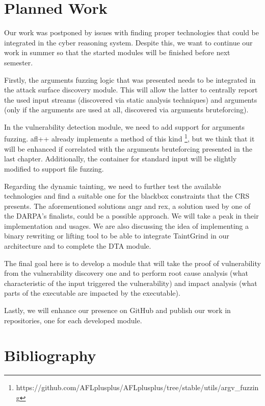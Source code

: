 \documentclass[12pt,a4paper,english,onecolumn]{IEEEtran}
\begin{document}
\section{Planned Work}

Our work was postponed by issues with finding proper technologies that could be integrated in the cyber reasoning system. Despite this, we want to continue our work in summer so that the started modules will be finished before next semester.

Firstly, the arguments fuzzing logic that was presented needs to be integrated in the attack surface discovery module. This will allow the latter to centrally report the used input streams (discovered via static analysis techniques) and arguments (only if the arguments are used at all, discovered via arguments bruteforcing).

In the vulnerability detection module, we need to add support for arguments fuzzing. afl++ already implements a method of this kind \footnote{https://github.com/AFLplusplus/AFLplusplus/tree/stable/utils/argv\_fuzzing}, but we think that it will be enhanced if correlated with the arguments bruteforcing presented in the last chapter. Additionally, the container for standard input will be slightly modified to support file fuzzing.

Regarding the dynamic tainting, we need to further test the available technologies and find a suitable one for the blackbox constraints that the CRS presents. The aforementioned solutions angr and rex, a solution used by one of the DARPA's finalists, could be a possible approach. We will take a peak in their implementation and usages. We are also discussing the idea of implementing a binary rewriting or lifting tool to be able to integrate TaintGrind in our architecture and to complete the DTA module.

The final goal here is to develop a module that will take the proof of vulnerability from the vulnerability discovery one and to perform root cause analysis (what characteristic of the input triggered the vulnerability) and impact analysis (what parts of the executable are impacted by the executable).

Lastly, we will enhance our presence on GitHub and publish our work in repositories, one for each developed module.

\section{Bibliography}
\nocite{*}
\printbibliography[heading=none]
\end{document}
